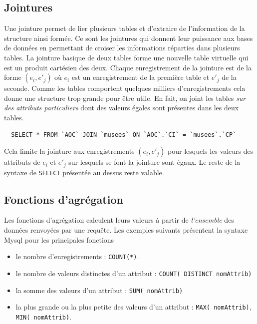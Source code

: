 \subsection{Jointures}
Une jointure permet de lier plusieurs tables et d'extraire de l'information de la structure ainsi formée. Ce sont les jointures qui donnent leur puissance aux bases de données en permettant de croiser les informations réparties dans plusieurs tables.\newline
La jointure basique de deux tables forme une nouvelle table virtuelle qui est un produit cartésien des deux. Chaque enregistrement de la jointure est de la forme $(e_i,e'_j)$ où $e_i$ est un enregistrement de la première table et $e'_j$ de la seconde. Comme les tables comportent quelques milliers d'enregistrements cela donne une structure trop grande pour être utile.\newline
En fait, on joint les tables \emph{sur des attributs particuliers} dont des valeurs égales sont présentes dans les deux tables.
\begin{verbatim}
  SELECT * FROM `AOC` JOIN `musees` ON `AOC`.`CI` = `musees`.`CP`
\end{verbatim}
Cela limite la jointure aux enregistrements $(e_i,e'_j)$ pour lesquels les valeurs des attributs de $e_i$ et $e'_j$ sur lesquels se font la jointure sont égaux.\newline
Le reste de la syntaxe de \verb|SELECT| présentée au dessus reste valable.

\subsection{Fonctions d'agrégation}
Les fonctions d'agrégation calculent leurs valeurs à partir de \emph{l'ensemble} des données renvoyées par une requête.\newline
Les exemples suivants présentent la syntaxe Mysql pour les principales fonctions 
\begin{itemize}
  \item le nombre d'enregistrements : \texttt{COUNT(*)}.
  \item le nombre de valeurs distinctes d'un attribut : \texttt{COUNT( DISTINCT nomAttrib)}
  \item la somme des valeurs d'un attribut : \texttt{SUM( nomAttrib)}
  \item la plus grande ou la plus petite des valeurs d'un attribut : \texttt{MAX( nomAttrib)}, \texttt{MIN( nomAttrib)}.
\end{itemize}



